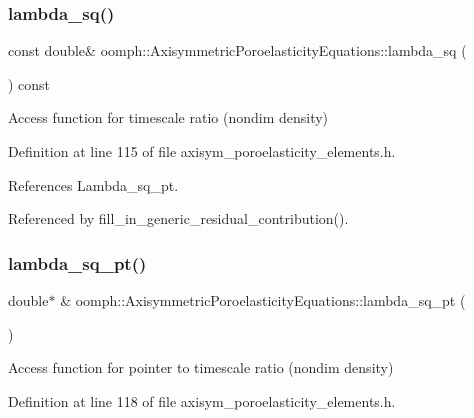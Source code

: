 \subsubsection{\texorpdfstring{lambda\+\_\+sq()}{lambda\_sq()}}
{\footnotesize\ttfamily const double\& oomph\+::\+Axisymmetric\+Poroelasticity\+Equations\+::lambda\+\_\+sq (\begin{DoxyParamCaption}{ }\end{DoxyParamCaption}) const\hspace{0.3cm}{\ttfamily [inline]}}



Access function for timescale ratio (nondim density) 



Definition at line 115 of file axisym\+\_\+poroelasticity\+\_\+elements.\+h.



References Lambda\+\_\+sq\+\_\+pt.



Referenced by fill\+\_\+in\+\_\+generic\+\_\+residual\+\_\+contribution().

\mbox{\label{classoomph_1_1AxisymmetricPoroelasticityEquations_a2442bdcf91f689440f9a5b622ea9ba0b}} 
\subsubsection{\texorpdfstring{lambda\+\_\+sq\+\_\+pt()}{lambda\_sq\_pt()}}
{\footnotesize\ttfamily double$\ast$ \& oomph\+::\+Axisymmetric\+Poroelasticity\+Equations\+::lambda\+\_\+sq\+\_\+pt (\begin{DoxyParamCaption}{ }\end{DoxyParamCaption})\hspace{0.3cm}{\ttfamily [inline]}}



Access function for pointer to timescale ratio (nondim density) 



Definition at line 118 of file axisym\+\_\+poroelasticity\+\_\+elements.\+h.



